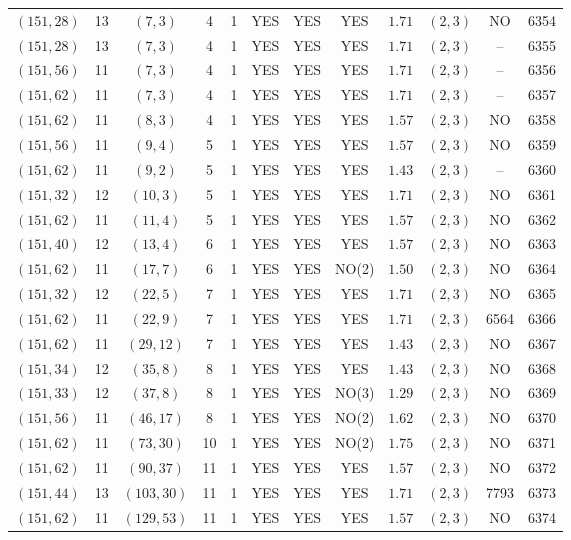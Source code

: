 \begin{longtable}{|c|c|c|c|c|c|c|c|c|c|c|c|}
$(151,28)$ & 13 & $(7,3)$ & 4 & 1 & YES & YES & YES & $1.71$ & $(2,3)$ & NO & 6354\\
$(151,28)$ & 13 & $(7,3)$ & 4 & 1 & YES & YES & YES & $1.71$ & $(2,3)$ & -- & 6355\\
$(151,56)$ & 11 & $(7,3)$ & 4 & 1 & YES & YES & YES & $1.71$ & $(2,3)$ & -- & 6356\\
$(151,62)$ & 11 & $(7,3)$ & 4 & 1 & YES & YES & YES & $1.71$ & $(2,3)$ & -- & 6357\\
$(151,62)$ & 11 & $(8,3)$ & 4 & 1 & YES & YES & YES & $1.57$ & $(2,3)$ & NO & 6358\\
$(151,56)$ & 11 & $(9,4)$ & 5 & 1 & YES & YES & YES & $1.57$ & $(2,3)$ & NO & 6359\\
$(151,62)$ & 11 & $(9,2)$ & 5 & 1 & YES & YES & YES & $1.43$ & $(2,3)$ & -- & 6360\\
$(151,32)$ & 12 & $(10,3)$ & 5 & 1 & YES & YES & YES & $1.71$ & $(2,3)$ & NO & 6361\\
$(151,62)$ & 11 & $(11,4)$ & 5 & 1 & YES & YES & YES & $1.57$ & $(2,3)$ & NO & 6362\\
$(151,40)$ & 12 & $(13,4)$ & 6 & 1 & YES & YES & YES & $1.57$ & $(2,3)$ & NO & 6363\\
$(151,62)$ & 11 & $(17,7)$ & 6 & 1 & YES & YES & NO(2) & $1.50$ & $(2,3)$ & NO & 6364\\
$(151,32)$ & 12 & $(22,5)$ & 7 & 1 & YES & YES & YES & $1.71$ & $(2,3)$ & NO & 6365\\
$(151,62)$ & 11 & $(22,9)$ & 7 & 1 & YES & YES & YES & $1.71$ & $(2,3)$ & 6564 & 6366\\
$(151,62)$ & 11 & $(29,12)$ & 7 & 1 & YES & YES & YES & $1.43$ & $(2,3)$ & NO & 6367\\
$(151,34)$ & 12 & $(35,8)$ & 8 & 1 & YES & YES & YES & $1.43$ & $(2,3)$ & NO & 6368\\
$(151,33)$ & 12 & $(37,8)$ & 8 & 1 & YES & YES & NO(3) & $1.29$ & $(2,3)$ & NO & 6369\\
$(151,56)$ & 11 & $(46,17)$ & 8 & 1 & YES & YES & NO(2) & $1.62$ & $(2,3)$ & NO & 6370\\
$(151,62)$ & 11 & $(73,30)$ & 10 & 1 & YES & YES & NO(2) & $1.75$ & $(2,3)$ & NO & 6371\\
$(151,62)$ & 11 & $(90,37)$ & 11 & 1 & YES & YES & YES & $1.57$ & $(2,3)$ & NO & 6372\\
$(151,44)$ & 13 & $(103,30)$ & 11 & 1 & YES & YES & YES & $1.71$ & $(2,3)$ & 7793 & 6373\\
$(151,62)$ & 11 & $(129,53)$ & 11 & 1 & YES & YES & YES & $1.57$ & $(2,3)$ & NO & 6374\\

\end{longtable}

